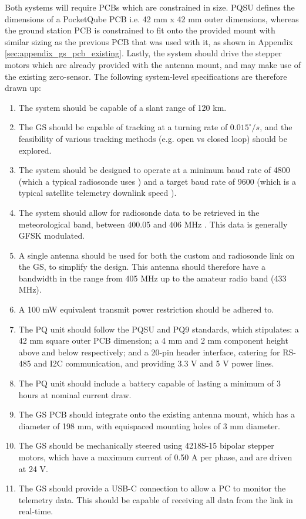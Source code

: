 Both systems will require PCBs which are constrained in size. PQSU defines the dimensions of a PocketQube PCB i.e. 42 mm x 42 mm outer dimensions, whereas the ground station PCB is constrained to fit onto the provided mount with similar sizing as the previous PCB that was used with it, as shown in Appendix \ref{sec:appendix_gs_pcb_existing}. Lastly, the system should drive the stepper motors which are already provided with the antenna mount, and may make use of the existing zero-sensor. The following system-level specifications are therefore drawn up:
\begin{enumerate}
    \item The system should be capable of a slant range of 120 km.
    \item The GS should be capable of tracking at a turning rate of $0.015^\circ / s$, and the feasibility of various tracking methods (e.g. open vs closed loop) should be explored.
    \item The system should be designed to operate at a minimum baud rate of 4800 (which a typical radiosonde uses \cite{datasheet-iMet54}) and a target baud rate of 9600 (which is a typical satellite telemetry downlink speed \cite{paper-deployableAntenna}).
    \item The system should allow for radiosonde data to be retrieved in the meteorological band, between 400.05 and 406 MHz \cite{datasheet-iMet54}. This data is generally GFSK modulated.
    \item A single antenna should be used for both the custom and radiosonde link on the GS, to simplify the design. This antenna should therefore have a bandwidth in the range from 405 MHz up to the amateur radio band (433 MHz).
    \item A 100 mW equivalent transmit power restriction should be adhered to.
    \item The PQ unit should follow the PQSU and PQ9 standards, which stipulates: a 42 mm square outer PCB dimension; a 4 mm and 2 mm component height above and below respectively; and a 20-pin header interface, catering for RS-485 and I2C communication, and providing 3.3 V and 5 V power lines.
    \item The PQ unit should include a battery capable of lasting a minimum of 3 hours at nominal current draw.
    \item The GS PCB should integrate onto the existing antenna mount, which has a diameter of 198 mm, with equispaced mounting holes of 3 mm diameter.
    \item The GS should be mechanically steered using 4218S-15 bipolar stepper motors, which have a maximum current of 0.50 A per phase, and are driven at 24 V.
    \item The GS should provide a USB-C connection to allow a PC to monitor the telemetry data. This should be capable of receiving all data from the link in real-time.
\end{enumerate}